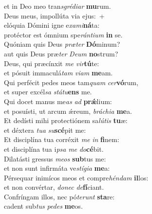 \evenverse et in Deo meo tran\textit{sgré}\textit{di}\textit{ar} \textbf{mu}rum.\\
\oddverse Deus meus, impollúta via ejus:~+\\
\oddverse  elóquia Dómini igne e\textit{xa}\textit{mi}\textbf{ná}ta:~\*\\
\oddverse protéctor est ómnium spe\textit{rán}\textit{ti}\textit{um} \textbf{in} se.\\
\evenverse Quóniam quis Deus \textit{præ}\textit{ter} \textbf{Dó}minum?~\*\\
\evenverse aut quis Deus præ\textit{ter} \textit{De}\textit{um} \textbf{no}strum?\\
\oddverse Deus, qui præcínxit \textit{me} \textit{vir}\textbf{tú}te:~\*\\
\oddverse et pósuit immaculá\textit{tam} \textit{vi}\textit{am} \textbf{me}am.\\
\evenverse Qui perfécit pedes meos tam\textit{quam} \textit{cer}\textbf{vó}rum,~\*\\
\evenverse et super excél\textit{sa} \textit{stá}\textit{tu}\textbf{ens} me.\\
\oddverse Qui docet manus me\textit{as} \textit{ad} \textbf{prǽ}lium:~\*\\
\oddverse et posuísti, ut arcum ǽreum, \textit{brá}\textit{chi}\textit{a} \textbf{me}a.\\
\evenverse Et dedísti mihi protectiónem sa\textit{lú}\textit{tis} \textbf{tu}æ:~\*\\
\evenverse et déxtera \textit{tu}\textit{a} \textit{su}\textbf{scé}pit me:\\
\oddverse Et disciplína tua corréxit \textit{me} \textit{in} \textbf{fi}nem:~\*\\
\oddverse et disciplína tua i\textit{psa} \textit{me} \textit{do}\textbf{cé}bit.\\
\evenverse Dilatásti gressus \textit{me}\textit{os} \textbf{sub}tus me:~\*\\
\evenverse et non sunt infirmáta ve\textit{stí}\textit{gi}\textit{a} \textbf{me}a:\\
\oddverse Pérsequar inimícos meos et compre\textit{hén}\textit{dam} \textbf{il}los:~\*\\
\oddverse et non convértar, \textit{do}\textit{nec} \textit{de}\textbf{fí}ciant.\\
\evenverse Confríngam illos, nec pó\textit{te}\textit{runt} \textbf{sta}re:~\*\\
\evenverse cadent sub\textit{tus} \textit{pe}\textit{des} \textbf{me}os.\\
